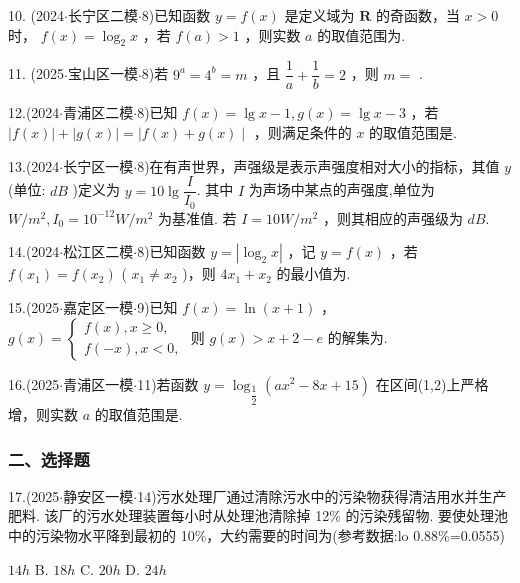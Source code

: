 10. (2024$\cdot$长宁区二模$\cdot$8)已知函数 $y = f\left( x\right)$ 是定义域为 $\mathbf{R}$ 的奇函数，当 $x > 0$ 时， $f\left( x\right)  = {\log }_{2}x$ ，若 $f\left( a\right)  > 1$ ，则实数 $a$ 的取值范围为\blkda[2]{}.

11. (2025$\cdot$宝山区一模$\cdot$8)若 ${9}^{a} = {4}^{b} = m$ ，且 $\dfrac{1}{a} + \dfrac{1}{b} = 2$ ，则 $m =$ \blkda[2]{}.

12.(2024$\cdot$青浦区二模$\cdot$8)已知 $f\left( x\right)  = \lg x - 1,g\left( x\right)  = \lg x - 3$ ，若 $\left| {f\left( x\right) }\right|  + \left| {g\left( x\right) }\right|  =  \mid  f\left( x\right)  +  g\left( x\right)  \mid$ ，则满足条件的 $x$ 的取值范围是\blkda[2]{}.

13.(2024$\cdot$长宁区一模$\cdot$8)在有声世界，声强级是表示声强度相对大小的指标，其值 $y$ (单位: ${{dB}}$ )定义为 $y = {10}\lg \dfrac{I}{{I}_{0}}$. 其中 $I$ 为声场中某点的声强度,单位为 ${W}/{{m}}^{2},{I}_{0} = {10}^{-{12}}{W}/{{m}}^{2}$ 为基准值. 若 $I = {10}{W}/{{m}}^{2}$ ，则其相应的声强级为\blkda[2]{} ${{dB}}$.

14.(2024$\cdot$松江区二模$\cdot$8)已知函数 $y = \left| {{\log }_{2}x}\right|$ ，记 $y = f\left( x\right)$ ，若 $f\left( {x}_{1}\right)  = f\left( {x}_{2}\right)$ ( ${x}_{1} \neq  {x}_{2}$ )，则 $4{x}_{1} + {x}_{2}$ 的最小值为\blkda[2]{}.

15.(2025$\cdot$嘉定区一模$\cdot$9)已知 $f\left( x\right)  = \ln \left( {x + 1}\right)$ ， $g\left( x\right)  = \left\{  \begin{array}{l} f\left( x\right) ,x \geq  0, \\  f\left( {-x}\right) ,x < 0, \end{array}\right.$ 则 $g\left( x\right)  > x + 2 - {e}$ 的解集为\blkda[2]{}.

16.(2025$\cdot$青浦区一模$\cdot$11)若函数 $y = {\log }_{\dfrac{1}{2}}\left( {a{x}^{2} - {8x} + {15}}\right)$ 在区间(1,2)上严格增，则实数 $a$ 的取值范围是\blkda[2]{}.

\subsubsection*{二、选择题}

17.(2025$\cdot$静安区一模$\cdot$14)污水处理厂通过清除污水中的污染物获得清洁用水并生产肥料. 该厂的污水处理装置每小时从处理池清除掉 12\% 的污染残留物. 要使处理池中的污染物水平降到最初的 10\%，大约需要的时间为(参考数据:lo 0.88\%=0.0555) \dotfill{(\kh{})}

\xx{}{}{}{}${14}{h}$ B. ${18}{h}$ C. ${20}{h}$ D. ${24}{h}$

